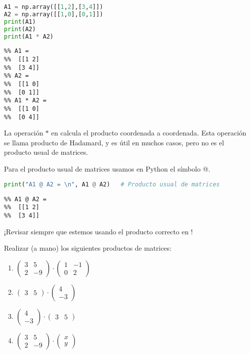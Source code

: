 \begin{Shaded}
\begin{lstlisting}[language=Python]
A1 = np.array([[1,2],[3,4]])
A2 = np.array([[1,0],[0,1]])
print(A1)
print(A2)
print(A1 * A2)
\end{lstlisting}
\end{Shaded}

\begin{verbatim}
%% A1 =
%%  [[1 2]
%%  [3 4]]
%% A2 =
%%  [[1 0]
%%  [0 1]]
%% A1 * A2 =
%%  [[1 0]
%%  [0 4]]
\end{verbatim}

La operación $*$ en \python calcula el producto coordenada a coordenada. Esta operación se llama producto de Hadamard, y es útil en muchos casos, pero no es el producto usual de matrices.

Para el producto usual de matrices usamos en Python el símbolo @.

\begin{Shaded}
\begin{lstlisting}[language=Python]
print("A1 @ A2 = \n", A1 @ A2)   # Producto usual de matrices
\end{lstlisting}
\end{Shaded}

\begin{verbatim}
%% A1 @ A2 =
%%  [[1 2]
%%  [3 4]]
\end{verbatim}

¡Revisar siempre que estemos usando el producto correcto en \python!

\begin{ejercicio} \label{ejer:productos}
Realizar (a mano) los siguientes productos de matrices:
\begin{enumerate}
\item  $\begin{pmatrix}3&5\\ 2 & -9 \end{pmatrix} \cdot \begin{pmatrix}1&-1\\ 0 & 2 \end{pmatrix}$
\item  $\begin{pmatrix}3&5\end{pmatrix} \cdot \begin{pmatrix}4\\ -3\end{pmatrix}$
\item  $\begin{pmatrix}4\\ -3\end{pmatrix} \cdot \begin{pmatrix}3&5\end{pmatrix}$
\item \label{item:sistema}  $\begin{pmatrix}3&5\\ 2 & -9 \end{pmatrix} \cdot \begin{pmatrix}x\\ y \end{pmatrix}$
\end{enumerate}
\end{ejercicio}

